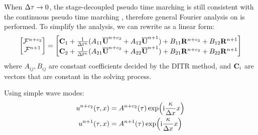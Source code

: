 When ${\Delta} \tau \rightarrow 0$, the stage-decoupled pseudo time marching
 is still consistent with the continuous
pseudo time marching , therefore
general Fourier analysis on  is performed.
To simplify the analysis, we can rewrite 
as a linear form:
\begin{equation}
    \begin{bmatrix}
        \mathcal{F}^{n+c_2} \\
        \mathcal{F}^{n+1}
    \end{bmatrix}
    =
    \begin{bmatrix}
        \mathbf{C}_1 + \frac{1}{{\Delta} t^n}(A_{11}\overline{\mathbf{U}}^{n+c_2} + A_{12}\overline{\mathbf{U}}^{n+1})
        + B_{11}\mathbf{R}^{n+c_2} + B_{12}\mathbf{R}^{n+1} \\
        \mathbf{C}_2 + \frac{1}{{\Delta} t^n}(A_{21}\overline{\mathbf{U}}^{n+c_2} + A_{22}\overline{\mathbf{U}}^{n+1})
        + B_{21}\mathbf{R}^{n+c_2} + B_{22}\mathbf{R}^{n+1}
    \end{bmatrix}
    \label{eq:linearDITRFF}
\end{equation}
where $A_{ij},B_{ij}$ are constant coefficients
decided by the DITR method, and $\mathbf{C}_i$ are
vectors that are constant in the solving process.

Using simple wave modes:
\begin{equation}
    \begin{aligned}
        u^{n+c_2}(\tau,x) & = A^{n+c_2}(\tau)\exp(\mathrm{i} \frac{\kappa}{{\Delta} x} x) \\
        u^{n+1}(\tau,x)   & = A^{n+1}(\tau)\exp(\mathrm{i} \frac{\kappa}{{\Delta} x} x)
    \end{aligned}
\end{equation}

